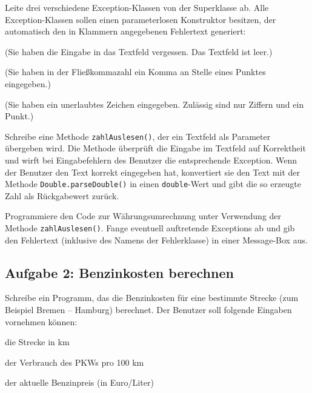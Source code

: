 \begin{compactenum}[a)]
\item Leite drei verschiedene Exception-Klassen von der Superklasse
 ab. Alle Exception-Klassen sollen einen parameterlosen
Konstruktor besitzen, der automatisch den in Klammern angegebenen Fehlertext generiert:

\begin{compactitem}
\item {}  (\glqq Sie haben die Eingabe in das Textfeld
vergessen. Das Textfeld ist leer.\grqq ) 
\item {} (\glqq Sie haben in der Fließkommazahl ein Komma
an Stelle eines Punktes eingegeben.\grqq )
\item {} (\glqq Sie haben ein unerlaubtes Zeichen
eingegeben.
Zulässig sind nur Ziffern und ein Punkt.\grqq )
\end{compactitem}

\item Schreibe eine Methode \lstinline|zahlAuslesen()|, der ein Textfeld als
Parameter übergeben wird. Die Methode überprüft die Eingabe im Textfeld auf
Korrektheit und wirft bei Eingabefehlern des Benutzer die  entsprechende
Exception. Wenn der Benutzer den Text korrekt eingegeben hat, konvertiert sie
den Text mit der Methode \lstinline|Double.parseDouble()| in einen
\lstinline|double|-Wert und gibt die so erzeugte Zahl als Rückgabewert zurück.

\item Programmiere den Code zur Währungsumrechnung unter Verwendung der
Methode \lstinline|zahlAuslesen()|. Fange eventuell auftretende Exceptions ab
und gib den Fehlertext (inklusive des Namens der Fehlerklasse) in einer
Message-Box aus.
\end{compactenum}


\subsection{Aufgabe 2: Benzinkosten berechnen}

Schreibe ein Programm, das die Benzinkosten für eine bestimmte Strecke (zum
Beispiel Bremen -- Hamburg) berechnet. Der Benutzer soll folgende Eingaben
vornehmen können:

\begin{compactitem}
\item die Strecke in km 
\item der Verbrauch des PKWs pro 100 km 
\item der aktuelle Benzinpreis (in Euro/Liter)
\end{compactitem}

